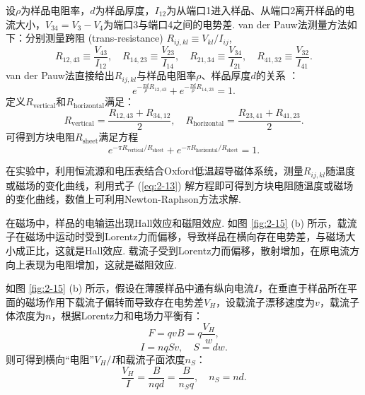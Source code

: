 \documentclass[12pt,a4paper,openany,twoside,UTF-8]{book}
\begin{document}
设$\rho$为样品电阻率，$d$为样品厚度，$I_{12}$为从端口1进入样品、从端口2离开样品的电流大小，$V_{34}=V_3-V_4$为端口3与端口4之间的电势差. van der Pauw法测量方法如下：分别测量跨阻 (trans-resistance) $R_{ij, kl}\equiv V_{kl}/I_{ij}$,
\begin{equation}
R_{12,43}\equiv\frac{V_{43}}{I_{12}},\quad R_{14,23}\equiv\frac{V_{23}}{I_{14}},\quad R_{21,34}\equiv\frac{V_{34}}{I_{21}},\quad R_{41,32}\equiv\frac{V_{32}}{I_{41}}.
\label{eq:2-10}
\end{equation}
van der Pauw法直接给出$R_{ij, kl}$与样品电阻率$\rho$、样品厚度$d$的关系 \cite{ref35}：
\begin{equation}
e^{-\frac{\pi d}{\rho}R_{12, 43}}+e^{-\frac{\pi d}{\rho}R_{14, 23}}=1.
\label{eq:2-11}
\end{equation}
定义$R_{\mathrm{vertical}}$和$R_{\mathrm{horizontal}}$满足：
\begin{equation}
R_{\mathrm{vertical}}=\frac{R_{12, 43}+R_{34, 12}}{2},\quad R_{\mathrm{horizontal}}=\frac{R_{23, 41}+R_{41, 23}}{2}.
\label{eq:2-12}
\end{equation}
可得到方块电阻$R_{\mathrm{sheet}}$满足方程
\begin{equation}
e^{-\pi R_{\mathrm{vertical}}/R_{\mathrm{sheet}}}+e^{-\pi R_{\mathrm{horizontal}}/R_{\mathrm{sheet}}}=1.
\label{eq:2-13}
\end{equation}

在实验中，利用恒流源和电压表结合Oxford低温超导磁体系统，测量$R_{ij, kl}$随温度或磁场的变化曲线，利用式子 (\ref{eq:2-13}) 解方程即可得到方块电阻随温度或磁场的变化曲线，数值上可利用Newton-Raphson方法求解. 

在磁场中，样品的电输运出现Hall效应和磁阻效应. 如图 \ref{fig:2-15} (b) 所示，载流子在磁场中运动时受到Lorentz力而偏移，导致样品在横向存在电势差，与磁场大小成正比，这就是Hall效应. 载流子受到Lorentz力而偏移，散射增加，在原电流方向上表现为电阻增加，这就是磁阻效应.

如图 \ref{fig:2-15} (b) 所示，假设在薄膜样品中通有纵向电流$I$，在垂直于样品所在平面的磁场作用下载流子偏转而导致存在电势差$V_H$，设载流子漂移速度为$v$，载流子体浓度为$n$，根据Lorentz力和电场力平衡有：
\begin{equation}
F=qvB=q\frac{V_H}{w},
\label{eq:2-14}
\end{equation}
\begin{equation}
I = nqSv,\quad S=dw.
\label{eq:2-15}
\end{equation}
则可得到横向“电阻”$V_H/I$和载流子面浓度$n_S$：
\begin{equation}
\frac{V_H}{I}=\frac{B}{nqd}=\frac{B}{n_Sq},\quad n_S=nd.
\label{eq:2-16}
\end{equation}
\end{document}
